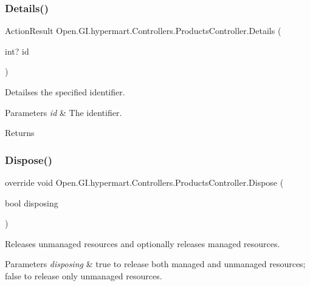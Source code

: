 \subsubsection{\texorpdfstring{Details()}{Details()}}
{\footnotesize\ttfamily Action\+Result Open.\+G\+I.\+hypermart.\+Controllers.\+Products\+Controller.\+Details (\begin{DoxyParamCaption}\item[{int?}]{id }\end{DoxyParamCaption})}



Detailses the specified identifier. 


\begin{DoxyParams}{Parameters}
{\em id} & The identifier.\\
\hline
\end{DoxyParams}
\begin{DoxyReturn}{Returns}

\end{DoxyReturn}
\hypertarget{class_open_1_1_g_i_1_1hypermart_1_1_controllers_1_1_products_controller_a242db0a0ce58c01d24fc41273dcc393f}{}\label{class_open_1_1_g_i_1_1hypermart_1_1_controllers_1_1_products_controller_a242db0a0ce58c01d24fc41273dcc393f} 
\subsubsection{\texorpdfstring{Dispose()}{Dispose()}}
{\footnotesize\ttfamily override void Open.\+G\+I.\+hypermart.\+Controllers.\+Products\+Controller.\+Dispose (\begin{DoxyParamCaption}\item[{bool}]{disposing }\end{DoxyParamCaption})\hspace{0.3cm}{\ttfamily [protected]}}



Releases unmanaged resources and optionally releases managed resources. 


\begin{DoxyParams}{Parameters}
{\em disposing} & true to release both managed and unmanaged resources; false to release only unmanaged resources.\\
\hline
\end{DoxyParams}
\hypertarget{class_open_1_1_g_i_1_1hypermart_1_1_controllers_1_1_products_controller_a203586ae68a295df5c7a037601e4b87a}{}\label{class_open_1_1_g_i_1_1hypermart_1_1_controllers_1_1_products_controller_a203586ae68a295df5c7a037601e4b87a} 
